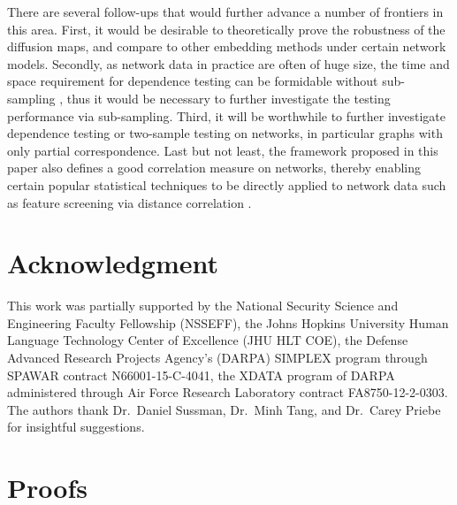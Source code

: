 \documentclass[12pt]{article}
\theoremstyle{definition}
\begin{document}
	There are several follow-ups that would further advance a number of frontiers in this area. First, it would be desirable to theoretically prove the robustness of the diffusion maps, and compare to other embedding methods under certain network models. Secondly, as network data in practice are often of huge size, the time and space requirement for dependence testing can be formidable without sub-sampling \citep{zhang2017large}, thus it would be necessary to further investigate the testing performance via sub-sampling. Third, it will be worthwhile to further investigate dependence testing or two-sample testing on networks, in particular graphs with only partial correspondence. Last but not least, the framework proposed in this paper also defines a good correlation measure on networks, thereby enabling certain popular statistical techniques to be directly applied to network data such as feature screening via distance correlation \citep{LiZhongZhu2012}.
	
	\clearpage
	
	
	
	\section*{Acknowledgment}
	This work was partially supported by the
	National Security Science and Engineering Faculty Fellowship (NSSEFF),
	the Johns Hopkins University Human Language Technology Center of Excellence (JHU HLT COE),  the
	Defense Advanced Research Projects Agency's (DARPA) SIMPLEX program through SPAWAR contract N66001-15-C-4041,
	the XDATA program of DARPA administered through Air Force Research Laboratory contract FA8750-12-2-0303.
	The authors thank Dr.~Daniel Sussman, Dr.~Minh Tang,  and Dr.~Carey Priebe for insightful suggestions.
	
	\clearpage
	\appendix
	\section{Proofs}
	\label{ssec:proof}
	
\end{document}
